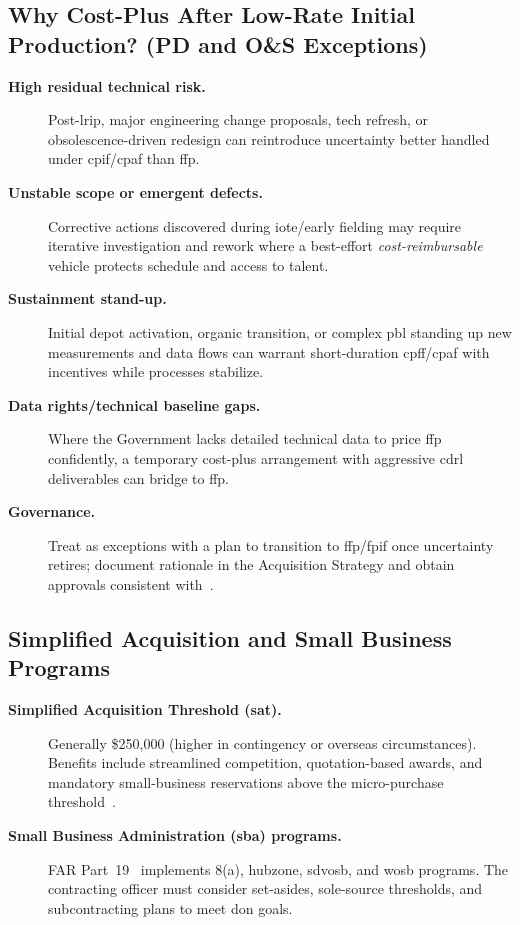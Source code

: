 \documentclass[../main.tex]{subfiles}
\begin{document}
\subsection{Why Cost-Plus After Low-Rate Initial Production? (PD and O\&S Exceptions)}
\begin{description}
  \item[\textbf{High residual technical risk.}] Post-\ac{lrip}, major engineering change proposals, tech refresh, or obsolescence-driven redesign can reintroduce uncertainty better handled under \ac{cpif}/\ac{cpaf} than \ac{ffp}.
  \item[\textbf{Unstable scope or emergent defects.}] Corrective actions discovered during \ac{iote}/early fielding may require iterative investigation and rework where a best-effort \emph{cost-reimbursable} vehicle protects schedule and access to talent.
  \item[\textbf{Sustainment stand-up.}] Initial depot activation, organic transition, or complex \ac{pbl} standing up new measurements and data flows can warrant short-duration \ac{cpff}/\ac{cpaf} with incentives while processes stabilize.
  \item[\textbf{Data rights/technical baseline gaps.}] Where the Government lacks detailed technical data to price \ac{ffp} confidently, a temporary cost-plus arrangement with aggressive \ac{cdrl} deliverables can bridge to \ac{ffp}.
  \item[\textbf{Governance.}] Treat as exceptions with a plan to transition to \ac{ffp}/\ac{fpif} once uncertainty retires; document rationale in the Acquisition Strategy and obtain approvals consistent with~\autocite{FAR,DFARS}.
\end{description}

\subsection{Simplified Acquisition and Small Business Programs}
\begin{description}
	\item[\textbf{Simplified Acquisition Threshold (\ac{sat}).}]Generally \$250{,}000 (higher in contingency or overseas circumstances). Benefits include streamlined competition, quotation-based awards, and mandatory small-business reservations above the micro-purchase threshold~\autocite{FAR}.
	\item[\textbf{Small Business Administration (\ac{sba}) programs.}] FAR Part~19~\autocite[Part~19]{FAR} implements 8(a), \ac{hubzone}, \ac{sdvosb}, and \ac{wosb} programs. The contracting officer must consider set-asides, sole-source thresholds, and subcontracting plans to meet \ac{don} goals.
\end{description}
\end{document}
